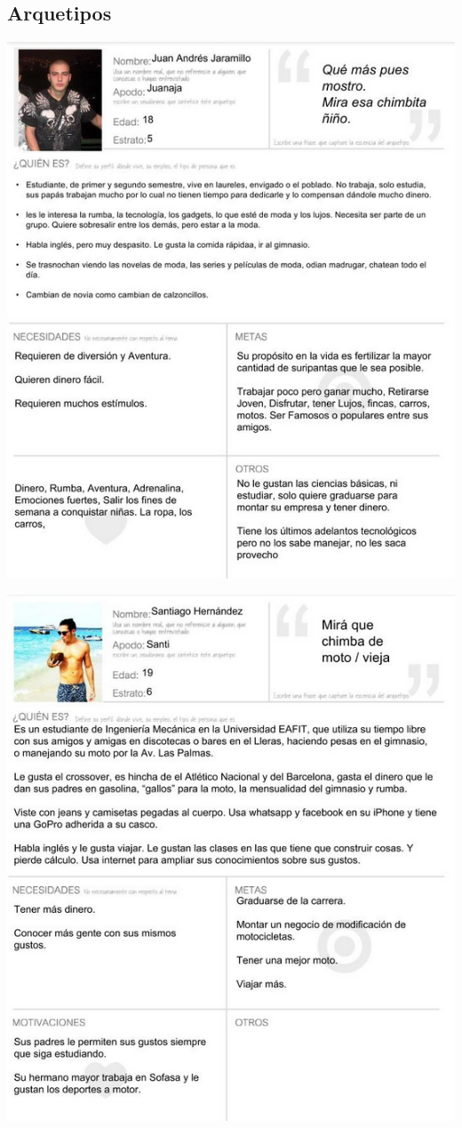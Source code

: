 \documentclass[twoside,letterpaper,12pt]{report}
\begin{document}
\subsection{Arquetipos} %
\label{sub:arquetipos}

\includegraphics[width=1\textwidth]{aux/arquetipo1}

\includegraphics[width=1\textwidth]{aux/arquetipo2}
\end{document}
